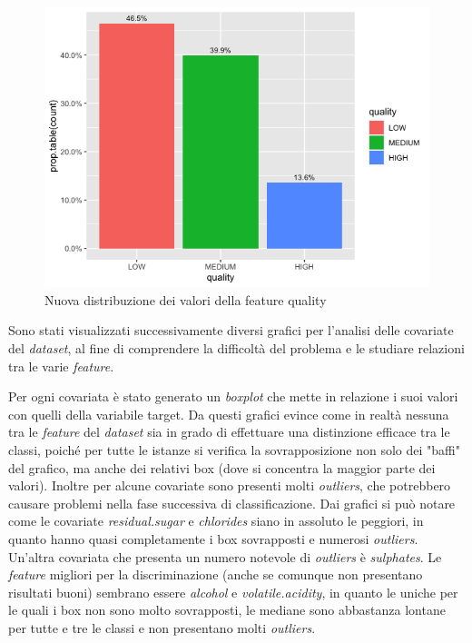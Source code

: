     \begin{figure}[!h]
        \includegraphics[scale=0.50]{img/Barplot_quality3.png}
        \centering
        \caption{Nuova distribuzione dei valori della feature quality}
        \label{fig:out_barplot3}
    \end{figure}    
    
    Sono stati visualizzati successivamente diversi grafici per l'analisi delle covariate del \textit{dataset}, al fine di comprendere la difficoltà del problema e le studiare relazioni tra le varie \textit{feature}.
    
    Per ogni covariata è stato generato un \textit{boxplot} che mette in relazione i suoi valori con quelli della variabile target. Da questi grafici evince come in realtà nessuna tra le \textit{feature} del \textit{dataset} sia in grado di effettuare una distinzione efficace tra le classi, poiché per tutte le istanze si verifica la sovrapposizione non solo dei "baffi" del grafico, ma anche dei relativi box (dove si concentra la maggior parte dei valori). Inoltre per alcune covariate sono presenti molti \textit{outliers}, che potrebbero causare problemi nella fase successiva di classificazione. 
    Dai grafici si può notare come le covariate \textit{residual.sugar} e \textit{chlorides} siano in assoluto le peggiori, in quanto hanno quasi completamente i box sovrapposti e numerosi \textit{outliers}. Un'altra covariata che presenta un numero notevole di \textit{outliers} è \textit{sulphates}. Le \textit{feature} migliori per la discriminazione (anche se comunque non presentano risultati buoni) sembrano essere \textit{alcohol} e \textit{volatile.acidity}, in quanto le uniche per le quali i box non sono molto sovrapposti, le mediane sono abbastanza lontane per tutte e tre le classi e non presentano molti \textit{outliers}.
    
